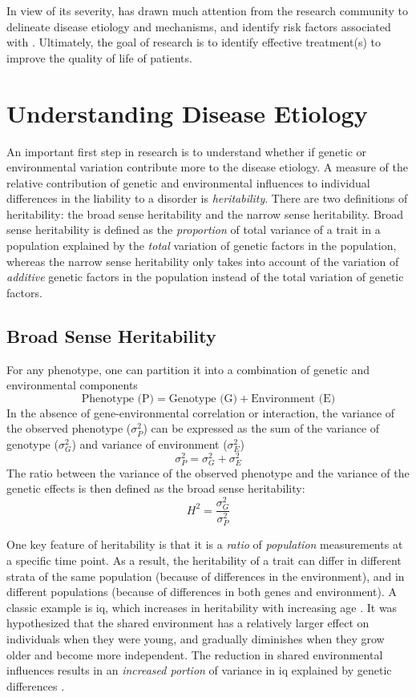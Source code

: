 	In view of its severity,  has drawn much attention from the research community to delineate disease etiology and mechanisms, and identify risk factors associated with .
	Ultimately, the goal of  research is to identify effective treatment(s) to improve the quality of life of patients.
	
	\section{Understanding Disease Etiology}
	An important first step in  research is to understand whether if genetic or environmental variation contribute more to the disease etiology.
	A measure of the relative contribution of genetic and environmental influences to individual differences in the liability to a disorder is \emph{heritability}.
	There are two definitions of heritability: the broad sense heritability and the narrow sense heritability.
	Broad sense heritability is defined as the \emph{proportion} of total variance of a trait in a population explained by the \emph{total} variation of genetic factors in the population, whereas the narrow sense heritability only takes into account of the variation of \emph{additive} genetic factors in the population instead of the total variation of genetic factors.
	
	\subsection{Broad Sense Heritability}
	For any phenotype, one can partition it into a combination of genetic and environmental components \citep{Falconer1996}
	$$
	\text{Phenotype (P)}=\text{Genotype (G)}+\text{Environment (E)}
	$$
	In the absence of gene-environmental correlation or interaction, the variance of the observed phenotype ($\sigma_P^2$) can be expressed as the sum of the variance of genotype ($\sigma_G^2$) and variance of environment ($\sigma_E^2$)
	$$
	\sigma_P^2=\sigma_G^2+\sigma_E^2
	$$
	The ratio between the variance of the observed phenotype and the variance of the genetic effects is then defined as the broad sense heritability:
	$$
	H^2=\frac{\sigma_G^2}{\sigma_P^2}
	$$
	
	One key feature of heritability is that it is a \emph{ratio} of \emph{population} measurements at a specific time point.
	As a result, the heritability of a trait can differ in different strata of the same population (because of differences in the environment), and in different populations (because of differences in both genes and environment).
	A classic example is \gls{iq}, which increases in heritability with increasing age \citep{Bouchard2013}.
	It was hypothesized that the shared environment has a relatively larger effect on individuals when they were young, and gradually diminishes when they grow older and become more independent.
	The reduction in shared environmental influences results in an \emph{increased portion} of variance in \gls{iq} explained by genetic differences \citep{Bouchard2013}. 
	
